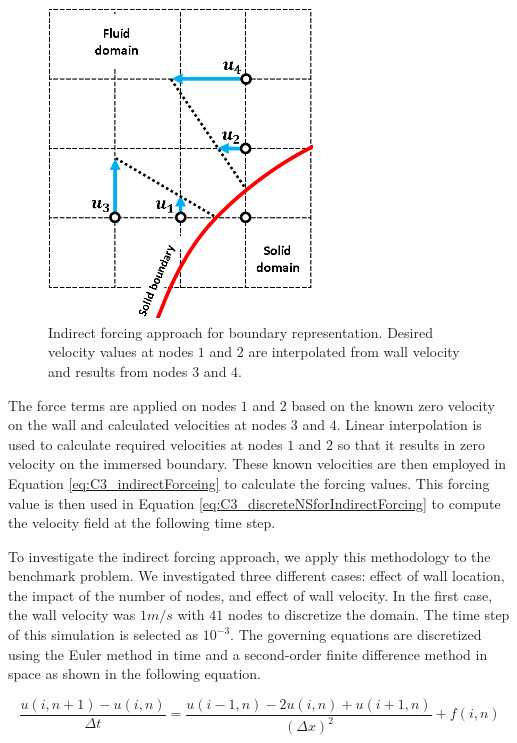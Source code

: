 \begin{figure}[H]
    \centering
    \includegraphics[width=7.00cm]{Chapter_3/figure/indirect_forcing_approach.png}
    \caption{Indirect forcing approach for boundary representation. Desired velocity values at nodes $1$ and $2$ are interpolated from wall velocity and results from nodes $3$ and $4$.}
    \label{fig:C3_indiredctForcingMethod}
\end{figure}

The force terms are applied on nodes $1$ and $2$ based on the known zero velocity on the wall and calculated velocities at nodes $3$ and $4$. Linear interpolation is used to calculate required velocities at nodes $1$ and $2$ so that it results in zero velocity on the immersed boundary. These known velocities are then employed in Equation \ref{eq:C3_indirectForceing} to calculate the forcing values. This forcing value is then used in Equation \ref{eq:C3_discreteNSforIndirectForcing} to compute the velocity field at the following time step.

To investigate the indirect forcing approach, we apply this methodology to the benchmark problem. We investigated three different cases: effect of wall location, the impact of the number of nodes, and effect of wall velocity. In the first case, the wall velocity was $1 m/s$ with $41$ nodes to discretize the domain. The time step of this simulation is selected as $10^{-3}$. The governing equations are discretized using the Euler method in time and a second-order finite difference method in space as shown in the following equation.

\begin{equation}
    \frac{u(i, n+1) - u(i, n)}{\Delta t} = \frac{u(i - 1, n) - 2u(i, n) + u(i + 1, n)}{(\Delta x)^2} + f(i, n)
\end{equation}


